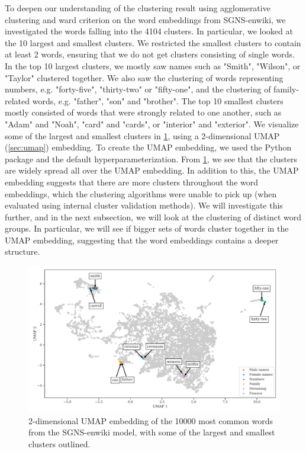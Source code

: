 To deepen our understanding of the clustering result using agglomerative clustering and ward criterion on the word embeddings from SGNS-enwiki, we investigated the words falling into the 4104 clusters. In particular, we looked at the 10 largest and smallest clusters. We restricted the smallest clusters to contain at least 2 words, ensuring that we do not get clusters consisting of single words. In the top 10 largest clusters, we mostly saw names such as "Smith", "Wilson", or "Taylor" clustered together. We also saw the clustering of words representing numbers, e.g. "forty-five", "thirty-two" or "fifty-one", and the clustering of family-related words, e.g. "father", "son" and "brother". The top 10 smallest clusters mostly consisted of words that were strongly related to one another, such as "Adam" and "Noah", "card" and "cards", or "interior" and "exterior". We visualize some of the largest and smallest clusters in \cref{fig:cluster-analysis-agglomerative-2d-umap-top-clusters}, using a 2-dimensional UMAP (\cref{sec:umap}) embedding. To create the UMAP embedding, we used the  Python package \cite{mcinnes2018umap-software} and the default hyperparameterization. From \cref{fig:cluster-analysis-agglomerative-2d-umap-top-clusters}, we see that the clusters are widely spread all over the UMAP embedding. In addition to this, the UMAP embedding suggests that there are more clusters throughout the word embeddings, which the clustering algorithms were unable to pick up (when evaluated using internal cluster validation methods). We will investigate this further, and in the next subsection, we will look at the clustering of distinct word groups. In particular, we will see if bigger sets of words cluster together in the UMAP embedding, suggesting that the word embeddings contains a deeper structure.
\begin{figure}
    \centering
    \includegraphics[width=\textwidth]{thesis/figures/cluster-analysis-agglomerative-2d-umap-top-clusters.pdf}
    \caption{2-dimensional UMAP embedding of the 10000 most common words from the SGNS-enwiki model, with some of the largest and smallest clusters outlined.}
    \label{fig:cluster-analysis-agglomerative-2d-umap-top-clusters}
\end{figure}


